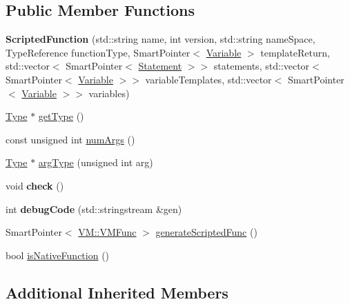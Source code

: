 \subsection*{Public Member Functions}
\begin{DoxyCompactItemize}
\item 
\hypertarget{class_scripted_function_a5c43e8fe3756e782f33bf9ed5dbcee9b}{{\bfseries Scripted\-Function} (std\-::string name, int version, std\-::string name\-Space, Type\-Reference function\-Type, Smart\-Pointer$<$ \hyperlink{class_variable}{Variable} $>$ template\-Return, std\-::vector$<$ Smart\-Pointer$<$ \hyperlink{class_statement}{Statement} $>$$>$ statements, std\-::vector$<$ Smart\-Pointer$<$ \hyperlink{class_variable}{Variable} $>$$>$ variable\-Templates, std\-::vector$<$ Smart\-Pointer$<$ \hyperlink{class_variable}{Variable} $>$$>$ variables)}\label{class_scripted_function_a5c43e8fe3756e782f33bf9ed5dbcee9b}

\item 
\hyperlink{class_type}{Type} $\ast$ \hyperlink{class_scripted_function_a3841e0c0f261be3199214c36a33e3e68}{get\-Type} ()
\item 
const unsigned int \hyperlink{class_scripted_function_a33e6157dbf33043399a981b2f30c3957}{num\-Args} ()
\item 
\hyperlink{class_type}{Type} $\ast$ \hyperlink{class_scripted_function_a55acb6fc25df756eb7a2f63149a4061e}{arg\-Type} (unsigned int arg)
\item 
\hypertarget{class_scripted_function_aa3846de822d0e552da2f8f8652fae958}{void {\bfseries check} ()}\label{class_scripted_function_aa3846de822d0e552da2f8f8652fae958}

\item 
\hypertarget{class_scripted_function_af1f2f8366c694d4fb2876c8a824f8a59}{int {\bfseries debug\-Code} (std\-::stringstream \&gen)}\label{class_scripted_function_af1f2f8366c694d4fb2876c8a824f8a59}

\item 
Smart\-Pointer$<$ \hyperlink{class_v_m_1_1_v_m_func}{V\-M\-::\-V\-M\-Func} $>$ \hyperlink{class_scripted_function_a983fdbee28bd4c16bd05713be5aef312}{generate\-Scripted\-Func} ()
\item 
bool \hyperlink{class_scripted_function_acf8e99d7cf657c2dd8e0e596e09ecc57}{is\-Native\-Function} ()
\end{DoxyCompactItemize}
\subsection*{Additional Inherited Members}


